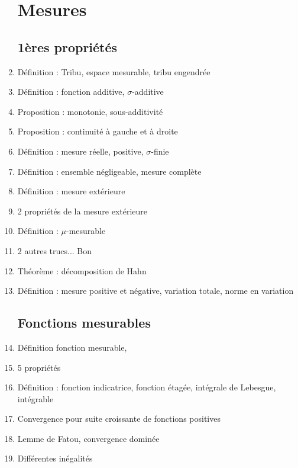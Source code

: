 \documentclass{article}
\begin{document}
\begin{enumerate}
\section{Mesures}
\subsection{1ères propriétés}
	\item Définition : Tribu, espace mesurable, tribu engendrée
	\item Définition : fonction additive, $\sigma$-additive
	\item Proposition : monotonie, sous-additivité
	\item Proposition : continuité à gauche et à droite
	\item Définition : mesure réelle, positive, $\sigma$-finie
	\item Définition : ensemble négligeable, mesure complète
	\item Définition : mesure extérieure
	\item 2 propriétés de la mesure extérieure
	\item Définition : $\mu$-mesurable
	\item 2 autres trucs... Bon
	\item Théorème : décomposition de Hahn
	\item Définition : mesure positive et négative, variation totale, norme en variation
\subsection{Fonctions mesurables}
	\item Définition fonction mesurable, 
	\item 5 propriétés
	\item Définition : fonction indicatrice, fonction étagée, intégrale de Lebesgue, intégrable
	\item Convergence pour suite croissante de fonctions positives
	\item Lemme de Fatou, convergence dominée
	\item Différentes inégalités
\end{enumerate}
\end{document}
